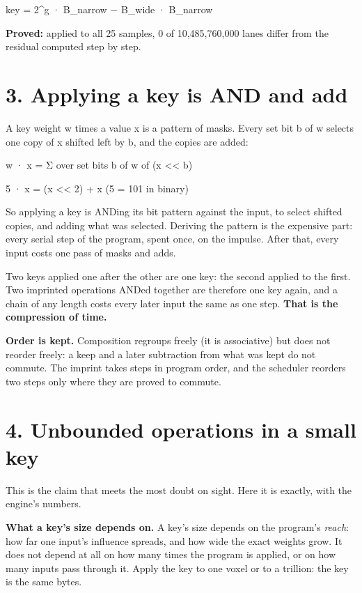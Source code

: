 key = 2\textasciicircum{}g · B\_\allowbreak{}narrow − B\_\allowbreak{}wide · B\_\allowbreak{}narrow

\textbf{Proved:} applied to all 25 samples, 0 of 10,485,760,000 lanes differ from the residual computed step by step.

\section{\texorpdfstring{3. Applying a key is AND and add}{3. Applying a key is AND and add}}

A key weight w times a value x is a pattern of masks. Every set bit b of w selects one copy of x shifted left by b, and the copies are added:

w · x = Σ over set bits b of w of (x << b)

5 · x = (x << 2) + x         (5 = 101 in binary)

So applying a key is ANDing its bit pattern against the input, to select shifted copies, and adding what was selected. Deriving the pattern is the expensive part: every serial step of the program, spent once, on the impulse. After that, every input costs one pass of masks and adds.

Two keys applied one after the other are one key: the second applied to the first. Two imprinted operations ANDed together are therefore one key again, and a chain of any length costs every later input the same as one step. \textbf{That is the compression of time.}

\textbf{Order is kept.} Composition regroups freely (it is associative) but does not reorder freely: a keep and a later subtraction from what was kept do not commute. The imprint takes steps in program order, and the scheduler reorders two steps only where they are proved to commute.

\section{\texorpdfstring{4. Unbounded operations in a small key}{4. Unbounded operations in a small key}}

This is the claim that meets the most doubt on sight. Here it is exactly, with the engine's numbers.

\textbf{What a key's size depends on.} A key's size depends on the program's \emph{reach}: how far one input's influence spreads, and how wide the exact weights grow. It does not depend at all on how many times the program is applied, or on how many inputs pass through it. Apply the key to one voxel or to a trillion: the key is the same bytes.

